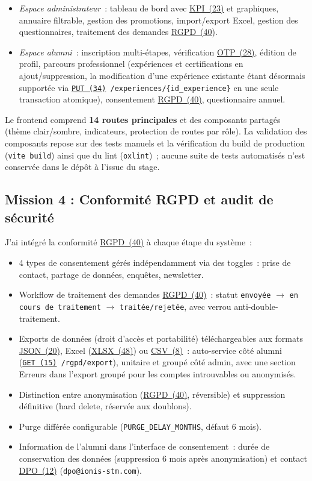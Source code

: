 \documentclass[12pt,a4paper]{report}
\begin{document}
\begin{itemize}
  \item \textit{Espace administrateur}~: tableau de bord avec \hyperlink{abbr-KPI}{KPI~(23)} et graphiques, annuaire filtrable, gestion des promotions, import/export Excel, gestion des questionnaires, traitement des demandes \hyperlink{abbr-RGPD}{RGPD~(40)}.
  \item \textit{Espace alumni}~: inscription multi-étapes, vérification \hyperlink{abbr-OTP}{OTP~(28)}, édition de profil, parcours professionnel (expériences et certifications en ajout/suppression, la modification d'une expérience existante étant désormais supportée via \texttt{\hyperlink{abbr-PUT}{PUT~(34)} /experiences/\{id\_experience\}} en une seule transaction atomique), consentement \hyperlink{abbr-RGPD}{RGPD~(40)}, questionnaire annuel.
\end{itemize}

Le frontend comprend \textbf{14 routes principales} et des composants partagés (thème clair/sombre, indicateurs, protection de routes par rôle). La validation des composants repose sur des tests manuels et la vérification du build de production (\texttt{vite build}) ainsi que du lint (\texttt{oxlint})~; aucune suite de tests automatisés n'est conservée dans le dépôt à l'issue du stage.

\subsection{Mission 4 : Conformité RGPD et audit de sécurité}

J'ai intégré la conformité \hyperlink{abbr-RGPD}{RGPD~(40)} à chaque étape du système~:

\begin{itemize}
  \item 4 types de consentement gérés indépendamment via des toggles~: prise de contact, partage de données, enquêtes, newsletter.
  \item Workflow de traitement des demandes \hyperlink{abbr-RGPD}{RGPD~(40)}~: statut \texttt{envoyée} $\rightarrow$ \texttt{en cours de traitement} $\rightarrow$ \texttt{traitée/rejetée}, avec verrou anti-double-traitement.
  \item Exports de données (droit d'accès et portabilité) téléchargeables aux formats \hyperlink{abbr-JSON}{JSON~(20)}, Excel (\hyperlink{abbr-XLSX}{XLSX~(48)}) ou \hyperlink{abbr-CSV}{CSV~(8)}~: auto-service côté alumni (\texttt{\hyperlink{abbr-GET}{GET~(15)} /rgpd/export}), unitaire et groupé côté admin, avec une section \og{}Erreurs\fg{} dans l'export groupé pour les comptes introuvables ou anonymisés.
  \item Distinction entre anonymisation (\hyperlink{abbr-RGPD}{RGPD~(40)}, réversible) et suppression définitive (hard delete, réservée aux doublons).
  \item Purge différée configurable (\texttt{PURGE\_DELAY\_MONTHS}, défaut 6 mois).
  \item Information de l'alumni dans l'interface de consentement~: durée de conservation des données (suppression 6 mois après anonymisation) et contact \hyperlink{abbr-DPO}{DPO~(12)} (\texttt{dpo@ionis-stm.com}).
\end{itemize}
\end{document}
